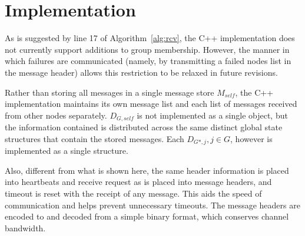 \documentclass[conference]{IEEEtran}
\begin{document}
\section{Implementation}
As is suggested by line 17 of Algorithm~\ref{alg:rcv}, the C++ implementation does not currently support additions to group membership. However, the manner in which failures are communicated (namely, by transmitting a failed nodes list in the message header) allows this restriction to be relaxed in future revisions.

Rather than storing all messages in a single message store $M_{self}$, the C++ implementation maintains its own message list and each list of messages received from other nodes separately. $D_{G,self}$ is not implemented as a single object, but the information contained is distributed across the same distinct global state structures that contain the stored messages. Each $D_{G*,j}, j \in G$, however is implemented as a single structure.

Also, different from what is shown here, the same header information is placed into heartbeats and receive request as is placed into message headers, and timeout is reset with the receipt of any message. This aids the speed of communication and helps prevent unnecessary timeouts. The message headers are encoded to and decoded from a simple binary format, which conserves channel bandwidth.
\end{document}

